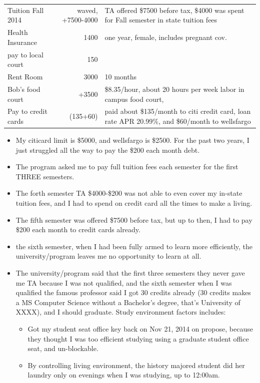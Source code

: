 \documentclass[9pt,b5paper]{article}
\begin{document}
\begin{center}
\begin{tabular}{lrl}
\hline
Tuition Fall 2014 & waved, +7500-4000 & TA offered \$7500 before tax, \$4000 was spent for Fall semester in state tuition fees\\
Health Insurance & 1400 & one year, female, includes pregnant cov.\\
pay to local court & 150 & \\
Rent Room & 3000 & 10 months\\
Bob's food court & +3500 & \$8.35/hour, about 20 hours per week labor in campus food court,\\
Pay to credit cards & (135+60) & paid about \$135/month to citi credit card, loan rate APR 20.99\%, and \$60/month to wellsfargo\\
\hline
\end{tabular}
\end{center}
\begin{itemize}
\item My citicard limit is \$5000, and wellsfargo is \$2500. For the past two years, I just struggled all the way to pay the \$200 each month debt.
\item The program asked me to pay full tuition fees each semester for the first THREE semesters.
\item The forth semester TA \$4000-\$200 was not able to even cover my in-state tuition fees, and I had to spend on credit card all the times to make a living.
\item The fifth semester was offered \$7500 before tax, but up to then, I had to pay \$200 each month to credit cards already.
\item the sixth semester, when I had been fully armed to learn more efficiently, the university/program leaves me no opportunity to learn at all.
\item The university/program said that the first three semesters they never gave me TA because I was not qualified, and the sixth semester when I was qualified the famous professor said I got 30 credits already (30 credits makes a MS Computer Science without a Bachelor's degree, that's University of XXXX), and I should graduate. Study environment factors includes: 
\begin{itemize}
\item Got my student seat office key back on Nov 21, 2014 on propose, because they thought I was too efficient studying using a graduate student office seat, and un-blockable.
\item By controlling living environment, the history majored student did her laundry only on evenings when I was studying, up to 12:00am.

\end{itemize}
\end{itemize}
\end{document}
